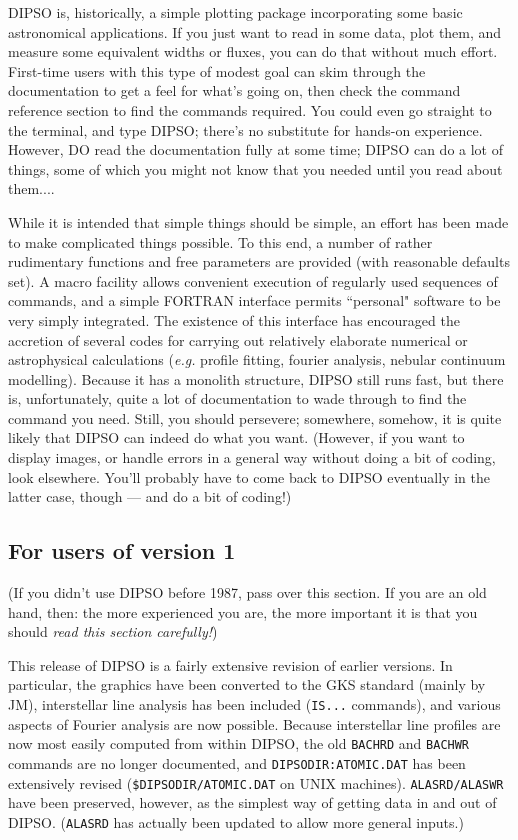 DIPSO is, historically, a simple plotting package incorporating some
basic astronomical applications. If you just want to read in some
data, plot them, and measure some equivalent widths or fluxes, you can
do that without much effort. First-time users with this type of modest
goal can skim through the documentation to get a feel for what's going
on, then check the command reference section to find the commands
required. You could even go straight to the terminal, and type DIPSO;
there's no substitute for hands-on experience. However, DO read the
documentation fully at some time;  DIPSO can do a lot of things, some
of which you might not know that you needed until you read about
them....

While it is intended that simple things should be simple, an effort
has been made to make complicated things possible. To this end, a
number of rather rudimentary functions and free parameters are
provided (with reasonable defaults set). A macro facility allows
convenient execution of regularly used sequences of commands, and a
simple FORTRAN interface permits ``personal" software to be very
simply integrated. The existence of this interface has encouraged the
accretion of several codes for carrying out relatively elaborate
numerical or astrophysical calculations ({\em e.g.} profile fitting,
fourier analysis, nebular continuum modelling). Because it has a
monolith structure, DIPSO still runs fast, but there is,
unfortunately, quite a lot of documentation to wade through to find
the command you need. Still, you should persevere; somewhere, somehow,
it is quite likely that DIPSO can indeed do what you want. (However,
if you want to display images, or handle errors in a general way
without doing a bit of coding, look elsewhere. You'll probably have to
come back to DIPSO eventually in the latter case, though --- and do a
bit of coding!)

\subsection {For users of version 1}

(If you didn't use DIPSO before 1987, pass over this section. If you
are an old hand, then: the more experienced you are, the more
important it is that you should {\em read this section carefully!})

This release of DIPSO is a fairly extensive revision of earlier
versions. In particular, the graphics have been converted to the GKS
standard (mainly by JM), interstellar line analysis has been included
({\tt IS...} commands), and various aspects of Fourier analysis are
now possible. Because interstellar line profiles are now most easily
computed from within DIPSO, the old {\tt BACHRD} and {\tt BACHWR}
commands are no longer documented, and {\tt DIPSODIR:ATOMIC.DAT} has
been extensively revised ({\tt \$DIPSODIR/ATOMIC.DAT} on UNIX
machines). {\tt ALASRD/ALASWR} have been preserved, however, as the
simplest way of getting data in and out of DIPSO. ({\tt ALASRD} has
actually been updated to allow more general inputs.)

